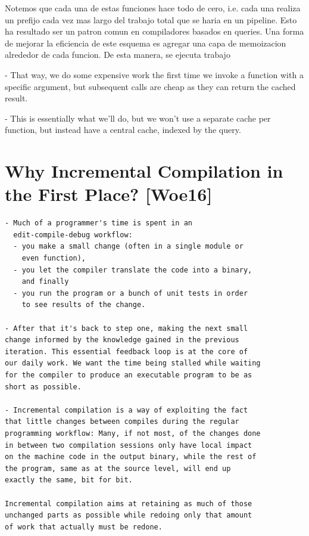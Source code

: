 \documentclass[12pt, a4paper]{report}
\begin{document}
Notemos que cada una de estas funciones hace todo de cero, i.e. cada una realiza un prefijo cada vez mas largo del trabajo total que se haria en un pipeline.
Esto ha resultado ser un patron comun en compiladores basados en queries.
Una forma de mejorar la eficiencia de este esquema es agregar una capa de memoizacion alrededor de cada funcion.
De esta manera, se ejecuta trabajo

- That way, we do some expensive work the first time we
invoke a function with a specific argument, but subsequent
calls are cheap as they can return the cached result.

- This is essentially what we'll do, but we won't use a
separate cache per function, but instead have a central
cache, indexed by the query.
\cite{olle_query_based}

\section*{Why Incremental Compilation in the First Place? [Woe16]}

\begin{verbatim}
- Much of a programmer's time is spent in an
  edit-compile-debug workflow:
  - you make a small change (often in a single module or
    even function),
  - you let the compiler translate the code into a binary,
    and finally
  - you run the program or a bunch of unit tests in order
    to see results of the change.

- After that it's back to step one, making the next small
change informed by the knowledge gained in the previous
iteration. This essential feedback loop is at the core of
our daily work. We want the time being stalled while waiting
for the compiler to produce an executable program to be as
short as possible.

- Incremental compilation is a way of exploiting the fact
that little changes between compiles during the regular
programming workflow: Many, if not most, of the changes done
in between two compilation sessions only have local impact
on the machine code in the output binary, while the rest of
the program, same as at the source level, will end up
exactly the same, bit for bit.

Incremental compilation aims at retaining as much of those
unchanged parts as possible while redoing only that amount
of work that actually must be redone.
\end{verbatim}
\cite{rust_blog_incremental_compilation}
\end{document}
